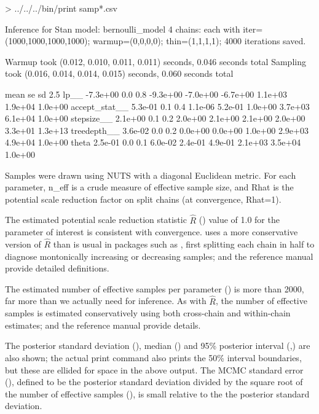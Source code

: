 \documentclass[article]{jss}
\begin{document}
\begin{CodeChunk}
\begin{CodeInput}
> ../../../bin/print samp*.csv
\end{CodeInput}
\small
\begin{CodeOutput}
Inference for Stan model: bernoulli_model
4 chains: each with iter=(1000,1000,1000,1000); warmup=(0,0,0,0); thin=(1,1,1,1); 
4000 iterations saved.

Warmup took (0.012, 0.010, 0.011, 0.011) seconds, 0.046 seconds total
Sampling took (0.016, 0.014, 0.014, 0.015) seconds, 0.060 seconds total

                   mean   se   sd     2.5%
lp__           -7.3e+00  0.0  0.8 -9.3e+00 -7.0e+00 -6.7e+00 1.1e+03 1.9e+04 1.0e+00
accept_stat__   5.3e-01  0.1  0.4  1.1e-06  5.2e-01  1.0e+00 3.7e+03 6.1e+04 1.0e+00
stepsize__      2.1e+00  0.1  0.2  2.0e+00  2.1e+00  2.1e+00 2.0e+00 3.3e+01 1.3e+13
treedepth__     3.6e-02  0.0  0.2  0.0e+00  0.0e+00  1.0e+00 2.9e+03 4.9e+04 1.0e+00
theta           2.5e-01  0.0  0.1  6.0e-02  2.4e-01  4.9e-01 2.1e+03 3.5e+04 1.0e+00

Samples were drawn using NUTS with a diagonal Euclidean metric.
For each parameter, n_eff is a crude measure of effective sample size,
and Rhat is the potential scale reduction factor on split chains (at 
convergence, Rhat=1).
\end{CodeOutput}
\end{CodeChunk}
%
The estimated potential scale reduction statistic $\hat{R}$
() value of 1.0 for the parameter of interest 
is consistent with convergence.   uses a more
conservative version of $\hat{R}$ than is usual in packages such as
 \citep{PlummerEtAl:2006}, first splitting each chain in half to diagnose
montonically increasing or decreasing samples; \citep{GelmanEtAl:2013}
and the reference manual provide detailed definitions.

The estimated number of effective samples per parameter
() is more than 2000, far more than we actually need for
inference.  As with $\hat{R}$, the number of effective samples is
estimated conservatively using both cross-chain and within-chain
estimates; \citep{GelmanEtAl:2013} and the reference manual provide
details.

The posterior standard deviation (), median () and
95\% posterior interval (,) are also shown;
the actual print command also prints the 50\% interval boundaries, but
these are ellided for space in the above output.  The MCMC standard
error (), defined to be the posterior standard deviation
divided by the square root of the number of effective samples
(), is small relative to the the posterior
standard deviation.
\end{document}
